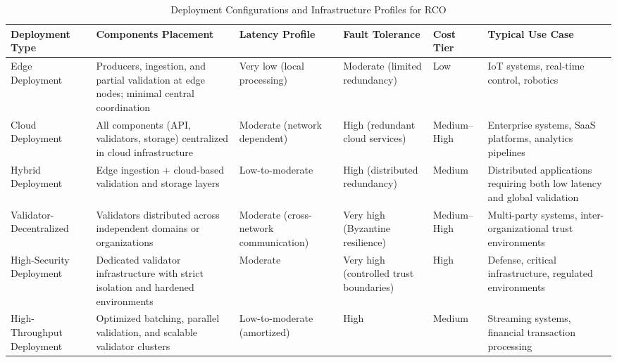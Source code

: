 \begin{table}[htbp]
\footnotesize
\centering
\caption{Deployment Configurations and Infrastructure Profiles for RCO}
\label{tab:deployment-config}

\renewcommand{\arraystretch}{1.25}

\begin{tabularx}{\textwidth}{|p{3cm}|X|p{2.5cm}|p{2.5cm}|p{2cm}|X|}
\hline
\textbf{Deployment Type} & \textbf{Components Placement} & \textbf{Latency Profile} & \textbf{Fault Tolerance} & \textbf{Cost Tier} & \textbf{Typical Use Case} \\
\hline

Edge Deployment & 
Producers, ingestion, and partial validation at edge nodes; minimal central coordination &
Very low (local processing) &
Moderate (limited redundancy) &
Low &
IoT systems, real-time control, robotics \\

\hline

Cloud Deployment &
All components (API, validators, storage) centralized in cloud infrastructure &
Moderate (network dependent) &
High (redundant cloud services) &
Medium–High &
Enterprise systems, SaaS platforms, analytics pipelines \\

\hline

Hybrid Deployment &
Edge ingestion + cloud-based validation and storage layers &
Low-to-moderate &
High (distributed redundancy) &
Medium &
Distributed applications requiring both low latency and global validation \\

\hline

Validator-Decentralized &
Validators distributed across independent domains or organizations &
Moderate (cross-network communication) &
Very high (Byzantine resilience) &
Medium–High &
Multi-party systems, inter-organizational trust environments \\

\hline

High-Security Deployment &
Dedicated validator infrastructure with strict isolation and hardened environments &
Moderate &
Very high (controlled trust boundaries) &
High &
Defense, critical infrastructure, regulated environments \\

\hline

High-Throughput Deployment &
Optimized batching, parallel validation, and scalable validator clusters &
Low-to-moderate (amortized) &
High &
Medium &
Streaming systems, financial transaction processing \\

\hline

\end{tabularx}
\end{table}


